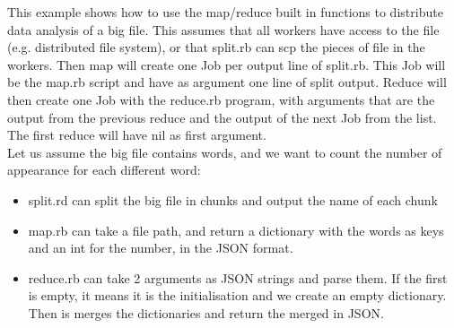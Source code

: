 This example shows how to use the map/reduce built in functions to distribute data
analysis of a big file. This assumes that all workers have access to the file (e.g.
distributed file system), or that split.rb can scp the pieces of file in the workers.
Then map will create one Job per output line of split.rb. This Job will be the map.rb
script and have as argument one line of split output. Reduce will then create one Job
with the reduce.rb program, with arguments that are the output from the previous reduce and
the output of the next Job from the list. The first reduce will have nil as first argument.\\
Let us assume the big file contains words, and we want to count the number of appearance for
each different word:
\begin{itemize}
  \item split.rd can split the big file in chunks and output the name of each chunk
  \item map.rb can take a file path, and return a dictionary with the words as keys
    and an int for the number, in the JSON format.
  \item reduce.rb can take 2 arguments as JSON strings and parse them. If the first is
    empty, it means it is the initialisation and we create an empty dictionary. Then is
    merges the dictionaries and return the merged in JSON.
\end{itemize}
